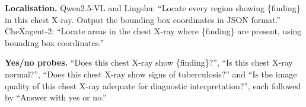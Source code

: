 \documentclass[pdflatex,sn-mathphys-num]{sn-jnl}
\theoremstyle{thmstyleone}
\begin{document}
\begin{appendices}
\textbf{Localisation.} Qwen2.5-VL and Lingshu: ``Locate every region showing \{finding\} in this chest X-ray. Output the bounding box coordinates in JSON format.'' CheXagent-2: ``Locate areas in the chest X-ray where \{finding\} are present, using bounding box coordinates.''

\textbf{Yes/no probes.} ``Does this chest X-ray show \{finding\}?'', ``Is this chest X-ray normal?'', ``Does this chest X-ray show signs of tuberculosis?'' and ``Is the image quality of this chest X-ray adequate for diagnostic interpretation?'', each followed by ``Answer with yes or no.''

\end{appendices}


\end{document}
